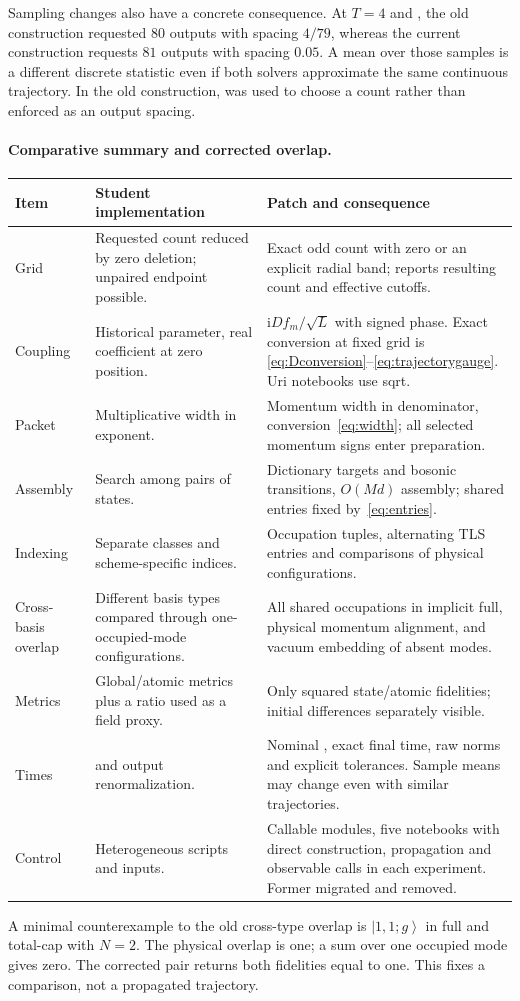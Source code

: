\documentclass[11pt,a4paper]{article}
\newcommand{\ket}[1]{\left|#1\right\rangle}
\newcommand{\ii}{\mathrm{i}}
\newcommand{\code}[1]{\texttt{\detokenize{#1}}}
\begin{document}
Sampling changes also have a concrete consequence. At $T=4$ and
\code{dt=0.05}, the old construction requested $80$ outputs with spacing
$4/79$, whereas the current construction requests $81$ outputs with spacing
$0.05$. A mean over those samples is a different discrete statistic even
if both solvers approximate the same continuous trajectory. In the old
construction, \code{dt} was used to choose a count rather than enforced as
an output spacing.

\paragraph{Comparative summary and corrected overlap.}
\begin{longtable}{p{}p{}p{}}
\toprule Item & Student implementation & Patch and consequence\\\midrule\endhead
Grid & Requested count reduced by zero deletion; unpaired endpoint
possible. & Exact odd count with zero or an explicit radial band; reports
resulting count and effective cutoffs.\\
Coupling & Historical parameter, real coefficient at zero position. &
$\ii Df_m/\sqrt L$ with signed phase. Exact conversion at fixed grid is
\eqref{eq:Dconversion}--\eqref{eq:trajectorygauge}. Uri notebooks use sqrt.\\
Packet & Multiplicative width in exponent. & Momentum width in denominator,
conversion~\eqref{eq:width}; all selected momentum signs enter preparation.\\
Assembly & Search among pairs of states. & Dictionary targets and bosonic
transitions, $O(Md)$ assembly; shared entries fixed by~\eqref{eq:entries}.\\
Indexing & Separate classes and scheme-specific indices. & Occupation tuples,
alternating TLS entries and comparisons of physical configurations.\\
Cross-basis overlap & Different basis types compared through one-occupied-mode
configurations. & All shared occupations in implicit full, physical momentum
alignment, and vacuum embedding of absent modes.\\
Metrics & Global/atomic metrics plus a ratio used as a field proxy. & Only
squared state/atomic fidelities; initial differences separately visible.\\
Times & \code{linspace(0,T,int(T/dt))} and output renormalization. & Nominal
\code{dt}, exact final time, raw norms and explicit tolerances. Sample means
may change even with similar trajectories.\\
Control & Heterogeneous scripts and inputs. & Callable modules, five notebooks
with direct construction, propagation and observable calls in each experiment.
Former \code{codex/} migrated and removed.\\
\bottomrule
\end{longtable}
A minimal counterexample to the old cross-type overlap is
$\ket{1,1;g}$ in full and total-cap with $N=2$. The physical overlap is one;
a sum over one occupied mode gives zero. The corrected pair returns both
fidelities equal to one. This fixes a comparison, not a propagated trajectory.
\end{document}
